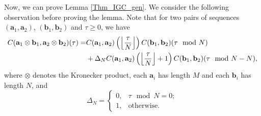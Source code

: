 \documentclass[pdflatex,sn-mathphys-num]{sn-jnl}%
\theoremstyle{thmstyleone}
\newcommand{\floor}[1]{\left\lfloor #1 \right\rfloor}
\begin{document}
	Now, we can prove Lemma \ref{Thm_IGC_gen}. We consider the following observation before proving the lemma. Note that for two pairs of sequences $(\mathbf{a}_1, \mathbf{a}_2)$, $(\mathbf{b}_1, \mathbf{b}_2)$ and $\tau \geq 0$, we have
	\begin{equation}\label{eqn_Kronecker}
		\begin{split}
			C (  \mathbf{a}_1 \otimes \mathbf{b}_1, \mathbf{a}_2 \otimes \mathbf{b}_2   ) (\tau)= &C ( \mathbf{a}_1, \mathbf{a}_2) \left( \floor{\frac{\tau}{N}}\right) C ( \mathbf{b}_1, \mathbf{b}_2 ) ( \tau  \mod N)\\
			&+  \Delta_N C ( \mathbf{a}_1, \mathbf{a}_2)  \left( \floor{\frac{\tau}{N}}  +  1 \right)  C ( \mathbf{b}_1, \mathbf{b}_2 ) ( \tau  \mod N - N),
		\end{split}
		\raisetag{5mm}
	\end{equation}
	where $\otimes$ denotes the Kronecker product, each $\mathbf{a}_i$ has length $M$ and each $\mathbf{b}_i$ has length $N$, and 
	\begin{equation}
		\Delta_N=
		\begin{cases}
			0, &\tau \mod N=0;\\
			1, &\text{otherwise}.
		\end{cases}
	\end{equation}
	
	
	
\end{document}
